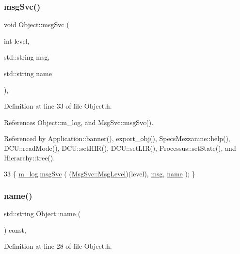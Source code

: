 \subsubsection{\texorpdfstring{msg\+Svc()}{msgSvc()}}
{\footnotesize\ttfamily void Object\+::msg\+Svc (\begin{DoxyParamCaption}\item[{int}]{level,  }\item[{std\+::string}]{msg,  }\item[{std\+::string}]{name }\end{DoxyParamCaption})\hspace{0.3cm}{\ttfamily [inline]}, {\ttfamily [inherited]}}



Definition at line 33 of file Object.\+h.



References Object\+::m\+\_\+log, and Msg\+Svc\+::msg\+Svc().



Referenced by Application\+::banner(), export\+\_\+obj(), Specs\+Mezzanine\+::help(), D\+C\+U\+::read\+Mode(), D\+C\+U\+::set\+H\+I\+R(), D\+C\+U\+::set\+L\+I\+R(), Processus\+::set\+State(), and Hierarchy\+::tree().


\begin{DoxyCode}
33 \{ \hyperlink{classObject_a0d269813dd7ac1f24bc143031e2963f2}{m\_log}.\hyperlink{classMsgSvc_ad25f18047920cc59a314e5098259711c}{msgSvc} ( (\hyperlink{classMsgSvc_ae671eb7301996cd049d2da8a65925926}{MsgSvc::MsgLevel})(level), \hyperlink{classObject_a58b2d0618c2d08cf2383012611528d97}{msg}, 
      \hyperlink{classObject_a300f4c05dd468c7bb8b3c968868443c1}{name} ); \}
\end{DoxyCode}
\mbox{\label{classObject_a300f4c05dd468c7bb8b3c968868443c1}} 
\subsubsection{\texorpdfstring{name()}{name()}}
{\footnotesize\ttfamily std\+::string Object\+::name (\begin{DoxyParamCaption}{ }\end{DoxyParamCaption}) const\hspace{0.3cm}{\ttfamily [inline]}, {\ttfamily [inherited]}}



Definition at line 28 of file Object.\+h.



